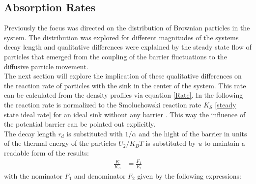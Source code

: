 \subsection{Absorption Rates}
Previously the focus was directed on the distribution of Brownian particles in the system. The distribution was explored for different magnitudes of the systems decay length and qualitative differences were explained by the steady state flow of particles that emerged from the coupling of the barrier fluctuations to the diffusive particle movement.\\
The next section will explore the implication of these qualitative differences on the reaction rate of particles with the sink in the center of the system. This rate can be calculated from the density profiles via equation \eqref{Rate}. In the following the reaction rate is normalized to the Smoluchowski reaction rate $K_S$ \eqref{steady state ideal rate} for an ideal sink without any barrier . This way the influence of the potential barrier can be pointed out explicitly. \\
The decay length $r_d$ is substituted with $1/\alpha$ and the hight of the barrier in units of the thermal energy of the particles $U_2/K_B T$ is substituted by $u$ to maintain a readable form of the results:
\begin{align}
    \frac{K}{K_{S}} &= \frac{F_1}{F_2}
    \label{two_state_rate}
\end{align}
with the nominator $F_1$ and denominator $F_2$ given by the following expressions:
